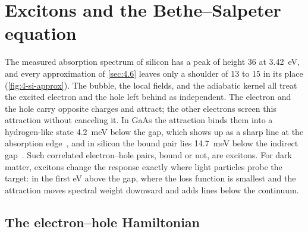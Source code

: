\section{Excitons and the Bethe--Salpeter equation}\label{sec:4.9}

The measured absorption spectrum of silicon has a peak of height 36 at \SI{3.42}{eV}, and every approximation of \cref{sec:4.6} leaves only a shoulder of 13 to 15 in its place (\cref{fig:4-si-approx}). The bubble, the local fields, and the adiabatic kernel all treat the excited electron and the hole left behind as independent. The electron and the hole carry opposite charges and attract; the other electrons screen this attraction without canceling it. In GaAs the attraction binds them into a hydrogen-like state \SI{4.2}{meV} below the gap, which shows up as a sharp line at the absorption edge~\cite{sell1972resolved}, and in silicon the bound pair lies \SI{14.7}{meV} below the indirect gap~\cite{shaklee1970valley}. Such correlated electron--hole pairs, bound or not, are excitons. For dark matter, excitons change the response exactly where light particles probe the target: in the first eV above the gap, where the loss function is smallest and the attraction moves spectral weight downward and adds lines below the continuum.

\subsection{The electron--hole Hamiltonian}

